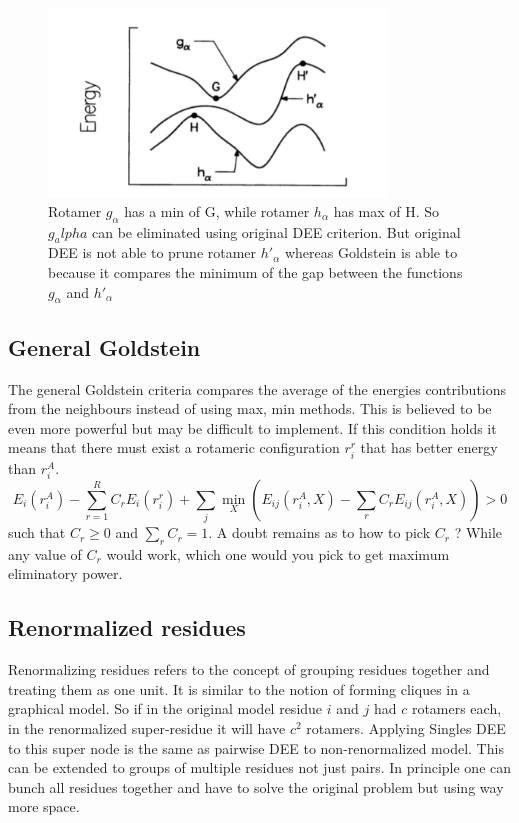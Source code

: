 \documentclass[a4]{article}
\begin{document}
\begin{figure}[h!]
    \centering
    \includegraphics[width=0.8\textwidth]{pics/gold1.pdf}
    \caption{Rotamer $g_\alpha$ has a min of G, while rotamer $h_\alpha$ has max of H. So $g_alpha$ can be eliminated using original DEE criterion. But original DEE is not able to prune rotamer $h'_{\alpha}$ whereas Goldstein is able to because it compares the minimum of the gap between the functions $g_\alpha$ and $h'_\alpha$}
    \label{fig:goldstein}
\end{figure}

\subsection{General Goldstein}
The general Goldstein criteria compares the average of the energies contributions from the neighbours instead of using max, min methods. This is believed to be even more powerful but may be difficult to implement. If this condition holds it means that there must exist a rotameric configuration $r_i^r$ that has better energy than $r_i^A$.
\[
E_i(r_i^A)-\sum_{r=1}^R C_r E_i(r_i^r) + \sum_j \min_X \left( E_{ij}(r_i^A,X) - \sum_r C_rE_{ij}(r_i^A,X) \right) >0
\]
such that $C_r \geq 0$ and $\sum_r C_r=1$.  A doubt remains as to how to pick $C_r$ ? While any value of $C_r$ would work, which one would you pick to get maximum eliminatory power.

\subsection{Renormalized residues}
Renormalizing residues refers to the concept of grouping residues together and treating them as one unit. It is similar to the notion of forming cliques in a graphical model. So if in the original model residue $i$ and $j$ had $c$ rotamers each, in the renormalized super-residue it will have $c^2$  rotamers. Applying Singles DEE to this super node is the same as pairwise DEE to non-renormalized model. This can be extended to groups of multiple residues not just pairs. In principle one can bunch all residues together and have to solve the original problem but using way more space. 
\end{document}
